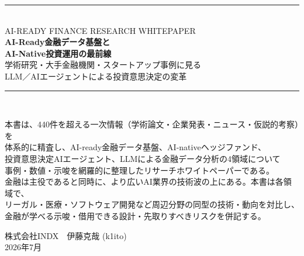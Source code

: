 \documentclass[11pt,a4paper]{ltjsarticle}
\begin{document}
\begin{titlepage}
\begin{center}
\vspace*{18mm}
{\color{brandaccent}\rule{\textwidth}{1.2pt}}\\[6mm]
{\sffamily\color{brandgray}\large AI-READY FINANCE RESEARCH WHITEPAPER}\\[10mm]
{\sffamily\bfseries\color{brandnavy}\LARGE AI-Ready金融データ基盤と\\[2mm] AI-Native投資運用の最前線}\\[6mm]
{\large\color{brandgray} 学術研究・大手金融機関・スタートアップ事例に見る\\ LLM／AIエージェントによる投資意思決定の変革}\\[10mm]
{\color{brandaccent}\rule{\textwidth}{1.2pt}}\\[14mm]

\begin{minipage}{0.8\textwidth}
\centering
\small\color{brandgray}
本書は、440件を超える一次情報（学術論文・企業発表・ニュース・仮説的考察）を\\
体系的に精査し、AI-ready金融データ基盤、AI-nativeヘッジファンド、\\
投資意思決定AIエージェント、LLMによる金融データ分析の4領域について\\
事例・数値・示唆を網羅的に整理したリサーチホワイトペーパーである。\\[2mm]
金融は主役であると同時に、より広いAI業界の技術波の上にある。本書は各領域で、\\
リーガル・医療・ソフトウェア開発など周辺分野の同型の技術・動向を対比し、\\
金融が学べる示唆・借用できる設計・先取りすべきリスクを併記する。
\end{minipage}

\vfill

{\small\color{brandgray} 株式会社INDX　伊藤克哉 (k1ito)}\\[1mm]
{\small\color{brandgray} 2026年7月}

\end{center}
\end{titlepage}

\newpage
\tableofcontents
\newpage











\end{document}
